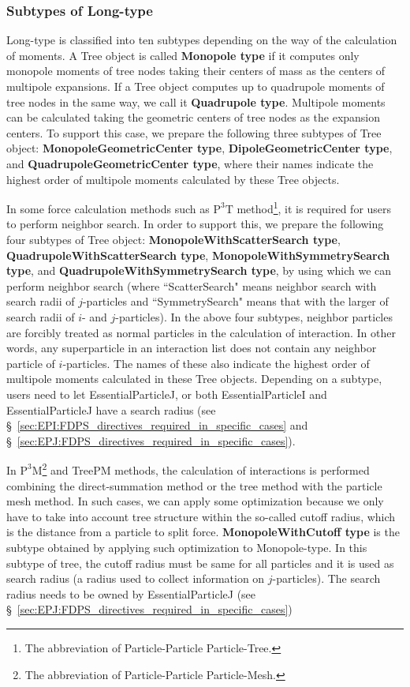 \subsubsection{Subtypes of Long-type}
\label{subsubsec:tree_kinds_long}
Long-type is classified into ten subtypes depending on the way of the calculation of moments. A Tree object is called \textbf{Monopole type} if it computes only monopole moments of tree nodes taking their centers of mass as the centers of multipole expansions. If a Tree object computes up to quadrupole moments of tree nodes in the same way, we call it \textbf{Quadrupole type}. Multipole moments can be calculated taking the geometric centers of tree nodes as the expansion centers. To support this case, we prepare the following three subtypes of Tree object: \textbf{MonopoleGeometricCenter type}, \textbf{DipoleGeometricCenter type}, and \textbf{QuadrupoleGeometricCenter type}, where their names indicate the highest order of multipole moments calculated by these Tree objects.

In some force calculation methods such as $\mathrm{P^{3}T}$ method\footnote{The abbreviation of Particle-Particle Particle-Tree.}, it is required for users to perform neighbor search. In order to support this, we prepare the following four subtypes of Tree object: \textbf{MonopoleWithScatterSearch type},  \textbf{QuadrupoleWithScatterSearch type}, \textbf{MonopoleWithSymmetrySearch type}, and \textbf{QuadrupoleWithSymmetrySearch type}, by using which we can perform neighbor search (where ``ScatterSearch" means neighbor search with search radii of $j$-particles and ``SymmetrySearch" means that with the larger of search radii of $i$- and $j$-particles). In the above four subtypes, neighbor particles are forcibly treated as normal particles in the calculation of interaction. In other words, any superparticle in an interaction list does not contain any neighbor particle of $i$-particles. The names of these also indicate the highest order of multipole moments calculated in these Tree objects. Depending on a subtype, users need to let EssentialParticleJ, or both EssentialParticleI and EssentialParticleJ have a search radius (see \S~\ref{sec:EPI:FDPS_directives_required_in_specific_cases} and \S~\ref{sec:EPJ:FDPS_directives_required_in_specific_cases}). 

In $\mathrm{P^{3}M}$\footnote{The abbreviation of Particle-Particle Particle-Mesh.} and TreePM methods, the calculation of interactions is performed combining the direct-summation method or the tree method with the particle mesh method. In such cases, we can apply some optimization because we only have to take into account tree structure within the so-called cutoff radius, which is the distance from a particle to split force. \textbf{MonopoleWithCutoff type} is the subtype obtained by applying such optimization to Monopole-type. In this subtype of tree, the cutoff radius must be same for all particles and it is used as search radius (a radius used to collect information on $j$-particles). The search radius needs to be owned by EssentialParticleJ (see \S~\ref{sec:EPJ:FDPS_directives_required_in_specific_cases})

